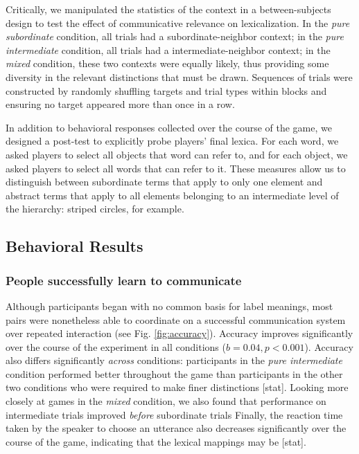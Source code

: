 \documentclass[10pt,letterpaper]{article}
\begin{document}
Critically, we manipulated the statistics of the context in a between-subjects design to test the effect of communicative relevance on lexicalization. In the \emph{pure subordinate} condition, all trials had a subordinate-neighbor context; in the \emph{pure intermediate} condition, all trials had a intermediate-neighbor context; in the \emph{mixed} condition, these two contexts were equally likely, thus providing some diversity in the relevant distinctions that must be drawn. Sequences of trials were constructed by randomly shuffling targets and trial types within blocks and ensuring no target appeared more than once in a row.

In addition to behavioral responses collected over the course of the game, we designed a post-test to explicitly probe players' final lexica. For each word, we asked players to select all objects that word can refer to, and for each object, we asked players to select all words that can refer to it. These measures allow us to distinguish between subordinate terms that apply to only one element and abstract terms that apply to all elements belonging to an intermediate level of the hierarchy: striped circles, for example.

\subsection{Behavioral Results}

\subsubsection{People successfully learn to communicate}

Although participants began with no common basis for label meanings, most pairs were nonetheless able to coordinate on a successful communication system over repeated interaction (see Fig. \ref{fig:accuracy}). 
Accuracy improves significantly over the course of the experiment in all conditions ($b = 0.04, p < 0.001$). 
Accuracy also differs significantly \emph{across} conditions: participants in the \emph{pure intermediate} condition performed better throughout the game than participants in the other two conditions who were required to make finer distinctions [stat]. 
Looking more closely at games in the \emph{mixed} condition, we also found that performance on intermediate trials improved \emph{before} subordinate trials %
Finally, the reaction time taken by the speaker to choose an utterance also decreases significantly over the course of the game, indicating that the lexical mappings may be  [stat]. 
\end{document}
